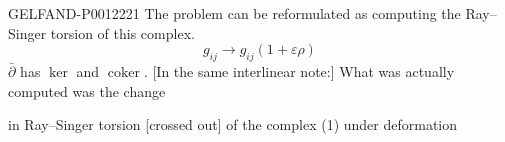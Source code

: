 \begin{GelfandAdjacentEvidence}{GELFAND-P001222}{1}
The problem can be reformulated as computing the Ray--Singer torsion of this complex.
\begin{equation*}
g_{ij}\longrightarrow g_{ij}(1+\varepsilon\rho)\tag{2}
\end{equation*}
\(\bar\partial\) has \(\ker\) and \(\operatorname{coker}\).
[In the same interlinear note:] What was actually computed was the change

in Ray--Singer torsion [crossed out] of the complex (1) under deformation
\end{GelfandAdjacentEvidence}
